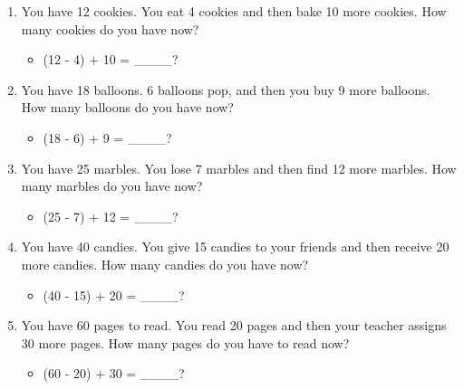 \begin{enumerate}
\begin{itemize}
    \end{itemize}
    \item You have 12 cookies. You eat 4 cookies and then bake 10 more cookies. How many cookies do you have now?
    \begin{itemize}
        \item (12 - 4) + 10 = \_\_\_\_?
    \end{itemize}
    \item You have 18 balloons. 6 balloons pop, and then you buy 9 more balloons. How many balloons do you have now?
    \begin{itemize}
        \item (18 - 6) + 9 = \_\_\_\_?
    \end{itemize}
    \item You have 25 marbles. You lose 7 marbles and then find 12 more marbles. How many marbles do you have now?
    \begin{itemize}
        \item (25 - 7) + 12 = \_\_\_\_?
    \end{itemize}
    \item You have 40 candies. You give 15 candies to your friends and then receive 20 more candies. How many candies do you have now?
    \begin{itemize}
        \item (40 - 15) + 20 = \_\_\_\_?
    \end{itemize}
    \item You have 60 pages to read. You read 20 pages and then your teacher assigns 30 more pages. How many pages do you have to read now?
    \begin{itemize}
        \item (60 - 20) + 30 = \_\_\_\_?
    \end{itemize}
\end{enumerate}

